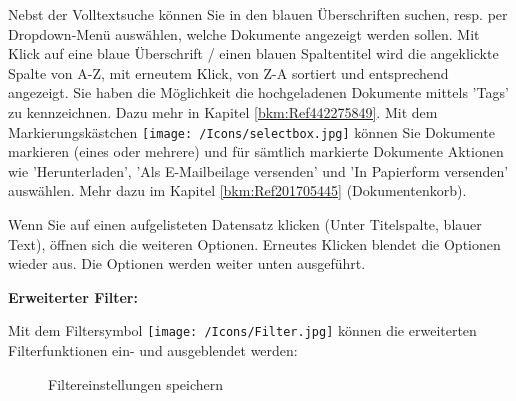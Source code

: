 Nebst der Volltextsuche können Sie in den blauen Überschriften  suchen, resp. per Dropdown-Menü auswählen, welche Dokumente angezeigt werden sollen. Mit Klick auf eine blaue Überschrift / einen blauen Spaltentitel wird die angeklickte Spalte von A-Z, mit erneutem Klick, von Z-A sortiert und entsprechend angezeigt. Sie haben die Möglichkeit die hochgeladenen Dokumente mittels 'Tags' zu kennzeichnen. Dazu mehr in Kapitel \ref{bkm:Ref442275849}. \newline
Mit dem Markierungskästchen \texttt{[image: /Icons/selectbox.jpg]}  können Sie Dokumente markieren (eines oder mehrere) und für sämtlich markierte Dokumente Aktionen wie 'Herunterladen', 'Als E-Mailbeilage versenden' und 'In Papierform versenden' auswählen. Mehr dazu im Kapitel \ref{bkm:Ref201705445} (Dokumentenkorb).

Wenn Sie auf einen aufgelisteten Datensatz klicken  (Unter Titelspalte, blauer Text), öffnen sich die weiteren Optionen. Erneutes Klicken blendet die Optionen wieder aus. Die Optionen werden weiter unten ausgeführt.

\vspace{\baselineskip}

\textbf{Erweiterter Filter:}\\
\label{bkm:Ref201704051}

Mit dem Filtersymbol \texttt{[image: /Icons/Filter.jpg]}  können die erweiterten Filterfunktionen ein- und ausgeblendet werden:

\begin{figure}[H]
\caption{Filtereinstellungen speichern}
\end{figure}

